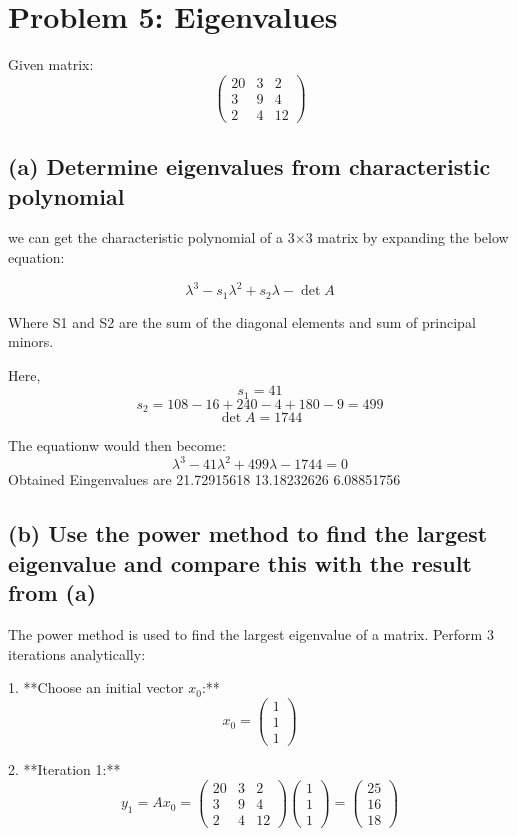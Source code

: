 \documentclass{article}
\begin{document}
\section*{Problem 5: Eigenvalues}

Given matrix:
\[ \begin{pmatrix} 20 & 3 & 2 \\ 3 & 9 & 4 \\ 2 & 4 & 12 \end{pmatrix} \]

\subsection*{(a) Determine eigenvalues from characteristic polynomial}

we can get the characteristic polynomial of a 3$\times$3 matrix by expanding the below equation: 

\[\lambda^3-s_1\lambda^2+s_2\lambda-\det A\]

Where S1 and S2 are the sum of the diagonal elements and sum of principal minors. 

Here, \[s_1=41\]
\[s_2 =108-16 + 240 -4+180-9 = 499\]
\[\det A = 1744\]

The equationw would then become: 
\[\lambda^3-41\lambda^2+499\lambda- 1744 = 0\]
Obtained Eingenvalues are 21.72915618 13.18232626  6.08851756
\subsection*{(b) Use the power method to find the largest eigenvalue and compare this with the result from (a)}

The power method is used to find the largest eigenvalue of a matrix. Perform 3 iterations analytically:

1. **Choose an initial vector \( x_0 \):**
\[ x_0 = \begin{pmatrix} 1 \\ 1 \\ 1 \end{pmatrix} \]

2. **Iteration 1:**
\[ y_1 = Ax_0 = \begin{pmatrix} 20 & 3 & 2 \\ 3 & 9 & 4 \\ 2 & 4 & 12 \end{pmatrix} \begin{pmatrix} 1 \\ 1 \\ 1 \end{pmatrix} = \begin{pmatrix} 25 \\ 16 \\ 18 \end{pmatrix} \]
\end{document}
